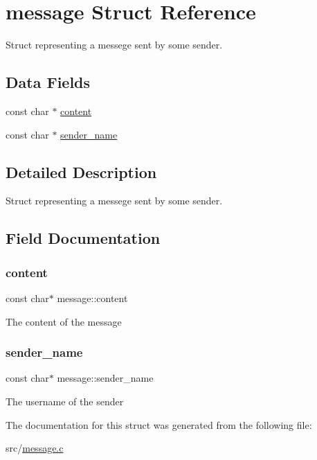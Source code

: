 \hypertarget{structmessage}{}\section{message Struct Reference}
\label{structmessage}


Struct representing a messege sent by some sender.  


\subsection*{Data Fields}
\begin{DoxyCompactItemize}
\item 
const char $\ast$ \hyperlink{structmessage_ad3b965525fe62cb25162084d97a3f0ff}{content}
\item 
const char $\ast$ \hyperlink{structmessage_a93d4525b657c15744e45ca9504840000}{sender\+\_\+name}
\end{DoxyCompactItemize}


\subsection{Detailed Description}
Struct representing a messege sent by some sender. 

\subsection{Field Documentation}
\mbox{\label{structmessage_ad3b965525fe62cb25162084d97a3f0ff}} 
\subsubsection{\texorpdfstring{content}{content}}
{\footnotesize\ttfamily const char$\ast$ message\+::content}

The content of the message \mbox{\label{structmessage_a93d4525b657c15744e45ca9504840000}} 
\subsubsection{\texorpdfstring{sender\+\_\+name}{sender\_name}}
{\footnotesize\ttfamily const char$\ast$ message\+::sender\+\_\+name}

The username of the sender 

The documentation for this struct was generated from the following file\+:\begin{DoxyCompactItemize}
\item 
src/\hyperlink{message_8c}{message.\+c}\end{DoxyCompactItemize}
